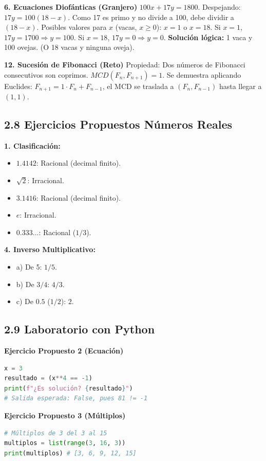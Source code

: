 \documentclass[letterpaper, 12pt]{article}
\begin{document}
\textbf{6. Ecuaciones Diofánticas (Granjero)}
$100x + 17y = 1800$.
Despejando: $17y = 100(18-x)$. Como 17 es primo y no divide a 100, debe dividir a $(18-x)$.
Posibles valores para $x$ (vacas, $x \ge 0$): $x=1$ o $x=18$.
Si $x=1$, $17y = 1700 \Rightarrow y=100$.
Si $x=18$, $17y = 0 \Rightarrow y=0$.
\textbf{Solución lógica:} 1 vaca y 100 ovejas. (O 18 vacas y ninguna oveja).

\textbf{12. Sucesión de Fibonacci (Reto)}
Propiedad: Dos números de Fibonacci consecutivos son coprimos.
$MCD(F_n, F_{n+1}) = 1$. Se demuestra aplicando Euclides: $F_{n+1} = 1 \cdot F_n + F_{n-1}$, el MCD se traslada a $(F_n, F_{n-1})$ hasta llegar a $(1,1)$.

\subsection{2.8 Ejercicios Propuestos Números Reales}

\textbf{1. Clasificación:}
\begin{itemize}
    \item $1.4142$: Racional (decimal finito).
    \item $\sqrt{2}$: Irracional.
    \item $3.1416$: Racional (decimal finito).
    \item $e$: Irracional.
    \item $0.333\dots$: Racional ($1/3$).
\end{itemize}

\textbf{4. Inverso Multiplicativo:}
\begin{itemize}
    \item a) De 5: $1/5$.
    \item b) De $3/4$: $4/3$.
    \item c) De $0.5$ ($1/2$): $2$.
\end{itemize}

\subsection{2.9 Laboratorio con Python}

\textbf{Ejercicio Propuesto 2 (Ecuación)}
\begin{lstlisting}[language=Python]
x = 3
resultado = (x**4 == -1)
print(f"¿Es solución? {resultado}") 
# Salida esperada: False, pues 81 != -1
\end{lstlisting}

\textbf{Ejercicio Propuesto 3 (Múltiplos)}
\begin{lstlisting}[language=Python]
# Múltiplos de 3 del 3 al 15
multiplos = list(range(3, 16, 3))
print(multiplos) # [3, 6, 9, 12, 15]
\end{lstlisting}
\end{document}
